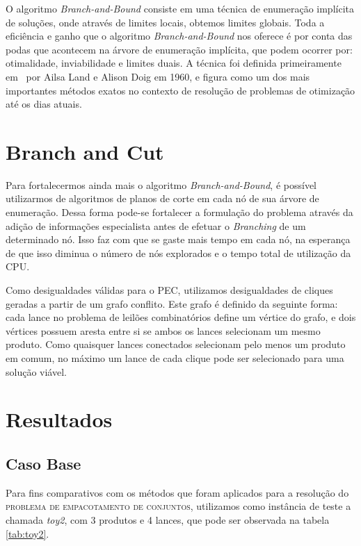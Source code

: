 \documentclass{article}
\begin{document}
	O algoritmo \emph{Branch-and-Bound} consiste em uma técnica de enumeração implícita de soluções, onde através de limites locais, obtemos limites globais. Toda a eficiência e ganho que o algoritmo \emph{Branch-and-Bound} nos oferece é por conta das podas que acontecem na árvore de enumeração implícita, que podem ocorrer por: otimalidade, inviabilidade e limites duais. A técnica foi definida primeiramente em~\cite{Land} por Ailsa Land e Alison Doig em 1960, e figura como um dos mais importantes métodos exatos no contexto de resolução de problemas de otimização até os dias atuais.
	
	
	
	\section{Branch and Cut}\label{sec:BC}
	Para fortalecermos ainda mais o algoritmo \emph{Branch-and-Bound}, é possível utilizarmos de algoritmos de planos de corte em cada nó de sua árvore de enumeração. {\color{red} Dessa forma pode-se fortalecer a formulação do problema através da adição de informações especialista antes de efetuar o \emph{Branching} de um determinado nó. Isso faz com que se gaste mais tempo em cada nó, na esperança de que isso diminua o número de nós explorados e o tempo total de utilização da CPU.}
	
	Como desigualdades válidas para o PEC, utilizamos desigualdades de cliques geradas a partir de um grafo conflito. Este grafo é definido da seguinte forma: cada lance no problema de leilões combinatórios define um vértice do grafo,
	{\color{red} e dois vértices possuem aresta entre si se ambos os lances selecionam um mesmo produto. Como quaisquer lances conectados selecionam pelo menos um produto em comum, no máximo um lance de cada clique pode ser selecionado para uma solução viável.}
	
	
	\section{Resultados}\label{sec:res}
	
		\subsection{Caso Base} \label{sec:caso}
	    Para fins comparativos com os métodos que foram aplicados para a resolução do \textsc{problema de empacotamento de conjuntos}, utilizamos como instância de teste a chamada \textit{toy2}, com 3 produtos e 4 lances, que pode ser observada na tabela \ref{tab:toy2}.
	    
\end{document}
